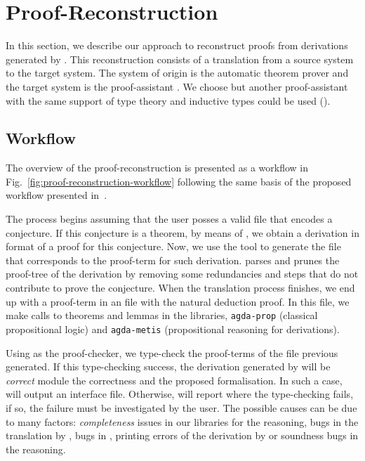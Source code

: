 \documentclass[../paper.tex]{subfiles}
\begin{document}

\section{Proof-Reconstruction}
\label{sec:proof-reconstruction}

In this section, we describe our approach to reconstruct proofs from
\CPL derivations generated by \Metis. This reconstruction consists of
a translation from a source system to the target system. The system of
origin is the automatic theorem prover \Metis and the target system is
the proof-assistant \Agda. We choose \Agda but another proof-assistant
with the same support of type theory and inductive types could be used
(\eg \Coq).

\subsection{Workflow}
\label{ssec:workflow}



The overview of the proof-reconstruction is presented as a workflow
in Fig.~\ref{fig:proof-reconstruction-workflow} following the same
basis of the proposed workflow presented in~\cite{sultana2015}.

The process begins assuming that the user posses a \TPTP valid file that encodes
a \CPL conjecture. If this conjecture is a theorem, by means of \Metis, we
obtain a derivation in \TSTP format of a proof for this conjecture. Now, we use
the \Athena tool to generate the \Agda file that corresponds to the proof-term
for such \TSTP derivation. \Athena parses and prunes the proof-tree of the \TSTP
derivation by removing some redundancies and steps that do not contribute to
prove the conjecture. When the translation process finishes, we end up with a
proof-term in an \Agda file with the natural deduction proof. In this file, we
make calls to theorems and lemmas in the \Agda libraries, \texttt{agda-prop}
(classical propositional logic) and \texttt{agda-metis} (propositional reasoning
for \Metis derivations).

Using \Agda as the proof-checker, we type-check the proof-terms of the \Agda
file previous generated. If this type-checking success, the \TSTP derivation
generated by \Metis will be \emph{correct} module the \Agda correctness and the
proposed formalisation. In such a case, \Agda will output an interface file.
Otherwise, \Agda will report where the type-checking fails, if so, the failure
must be investigated by the user. The possible causes can be due to many
factors: \emph{completeness} issues in our \Agda libraries for the \Metis
reasoning, bugs in the translation by \Athena, bugs in \Agda, printing errors of
the \TSTP derivation by \Metis or soundness bugs in the \Metis reasoning.
\end{document}
